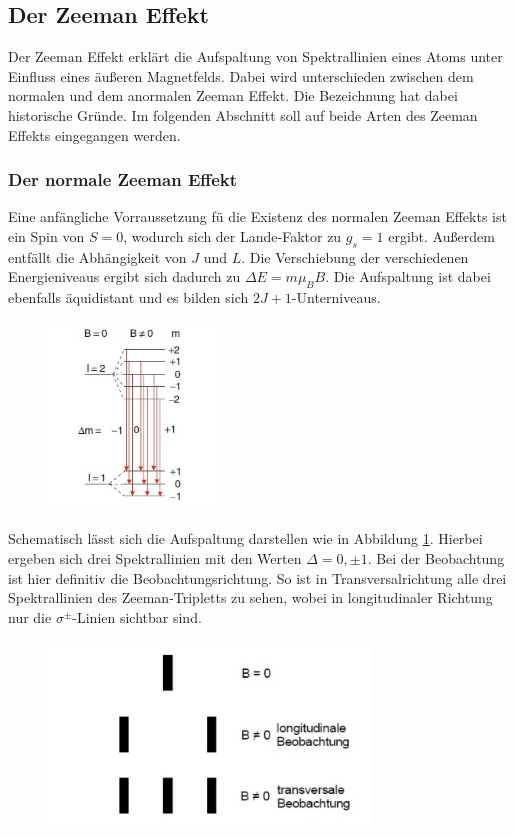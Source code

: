 \subsection{Der Zeeman Effekt}
Der Zeeman Effekt erklärt die Aufspaltung von Spektrallinien eines Atoms unter Einfluss eines äußeren Magnetfelds. Dabei wird unterschieden zwischen dem normalen und dem anormalen Zeeman Effekt. Die Bezeichnung hat dabei historische Gründe. Im folgenden Abschnitt soll auf beide Arten des Zeeman Effekts eingegangen werden.
\subsubsection{Der normale Zeeman Effekt}
Eine anfängliche Vorraussetzung fü die Existenz des normalen Zeeman Effekts ist ein Spin von $S=0$, wodurch sich der Lande-Faktor zu $g_s=1$ ergibt. Außerdem entfällt die Abhängigkeit von $J$ und $L$. Die Verschiebung der verschiedenen Energieniveaus ergibt sich dadurch zu $\Delta E=m\mu_B B$. Die Aufspaltung ist dabei ebenfalls äquidistant und es bilden sich $2J+1$-Unterniveaus.
\begin{figure}[H]
    \centering
    \captionsetup{justification=centering}
    \includegraphics[height=5cm]{"Zeeman_Energieniveaus.png"}
    \label{Fig:Zeeman_Energieniveaus}
\end{figure}
Schematisch lässt sich die Aufspaltung darstellen wie in Abbildung \ref{Fig:Zeeman_Energieniveaus}. Hierbei ergeben sich drei Spektrallinien mit den Werten $\Delta =0,\pm 1$. Bei der Beobachtung ist hier definitiv die Beobachtungsrichtung. So ist in Transversalrichtung alle drei Spektrallinien des Zeeman-Tripletts zu sehen, wobei in longitudinaler Richtung nur die $\sigma^\pm$-Linien sichtbar sind.
\begin{figure}[H]
    \centering
    \captionsetup{justification=centering}
    \includegraphics[height=5cm]{"Aufspaltungsbild.png"}
    \label{Fig:Aufspaltung}
\end{figure}
